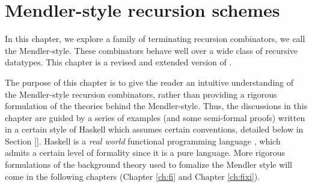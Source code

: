 \chapter{Mendler-style recursion schemes}\label{ch:mendler}

In this chapter,
we explore a family of terminating recursion combinators,
we call the Mendler-style. These combinators behave
well over a wide class of recursive datatypes. 
This chapter is a revised and extended version of \citet{AhnShe11}. 

The purpose of this chapter is to give the reader an intuitive understanding of
the Mendler-style recursion combinators, rather than providing a rigorous
formulation of the theories behind the Mendler-style.
Thus, the discussions in this chapter are guided by a series of examples
(and some semi-formal proofs) written in a certain style of Haskell
which assumes certain conventions, detailed below in Section \ref{}.
Haskell is a \emph{real world}
functional programming language \cite{OSullivan08}, which admits
a certain level of formality since it is a pure language.
More rigorous formulations of the background theory used to fomalize
the Mendler style will come
in the following chapters (Chapter \ref{ch:fi} and Chapter \ref{ch:fixi}).





